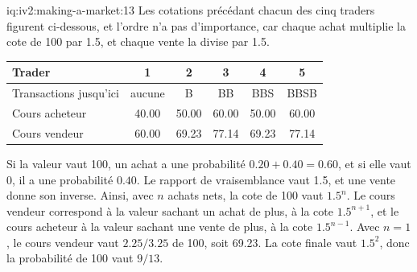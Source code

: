 \begin{solution}{iq:iv2:making-a-market:13}
Les cotations précédant chacun des cinq traders figurent ci-dessous, et l'ordre n'a pas d'importance, car chaque achat multiplie la cote de 100 par 1.5, et chaque vente la divise par 1.5.
\begin{center}\small
\begin{tabular}{@{}lccccc@{}}
Trader & 1 & 2 & 3 & 4 & 5 \\ \hline
Transactions jusqu'ici & aucune & B & BB & BBS & BBSB \\
Cours acheteur & 40.00 & 50.00 & 60.00 & 50.00 & 60.00 \\
Cours vendeur & 60.00 & 69.23 & 77.14 & 69.23 & 77.14
\end{tabular}
\end{center}

Si la valeur vaut 100, un achat a une probabilité $0.20 + 0.40 = 0.60$, et si elle vaut 0, il a une probabilité $0.40$. Le rapport de vraisemblance vaut 1.5, et une vente donne son inverse. Ainsi, avec $n$ achats nets, la cote de 100 vaut $1.5^n$. Le cours vendeur correspond à la valeur sachant un achat de plus, à la cote $1.5^{n+1}$, et le cours acheteur à la valeur sachant une vente de plus, à la cote $1.5^{n-1}$. Avec $n = 1$, le cours vendeur vaut $2.25/3.25$ de 100, soit 69.23. La cote finale vaut $1.5^2$, donc la probabilité de 100 vaut $9/13$.

\end{solution}

